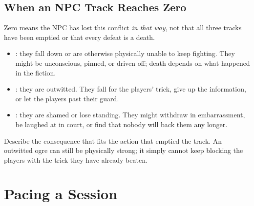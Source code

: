 \subsection*{When an NPC Track Reaches Zero}
Zero means the NPC has lost this conflict \emph{in that way}, not that
all three tracks have been emptied or that every defeat is a death.
\begin{itemize}
  \item {} : they fall down or are otherwise physically
    unable to keep fighting. They might be unconscious, pinned, or
    driven off; death depends on what happened in the fiction.
  \item {} : they are outwitted. They fall for the
    players' trick, give up the information, or let the players past
    their guard.
  \item {} : they are shamed or lose standing. They
    might withdraw in embarrassment, be laughed at in court, or find
    that nobody will back them any longer.
\end{itemize}
Describe the consequence that fits the action that emptied the track.
An outwitted ogre can still be physically strong; it simply cannot
keep blocking the players with the trick they have already beaten.

\section{Pacing a Session}
\lipsum[55][1-4]

\begin{notebox}[Behind the Screen]
\lipsum[56][1-3]
\end{notebox}
